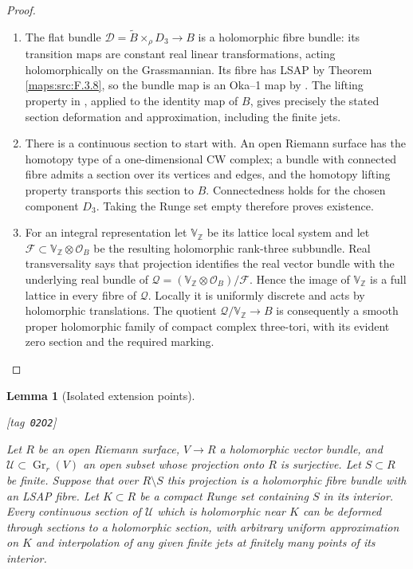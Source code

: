 \documentclass[11pt,a4paper]{article}
\numberwithin{equation}{section}
\newtheorem{lemma}[lemma]{Lemma}
\theoremstyle{definition}
\newcommand{\StatementRecord}[4]{{\upshape\footnotesize[tag~\texttt{#3}]}\enspace\ignorespaces}
\begin{document}
\begin{proof}
\begin{enumerate}[label=\arabic*.]
\item The flat bundle
$\mathscr D=\widetilde B\times_\rho D_3\to B$ is a holomorphic
fibre bundle: its transition maps are constant real linear
transformations, acting holomorphically on the Grassmannian.
Its fibre has LSAP by Theorem \ref{maps:src:F.3.8}, so the bundle map is an
Oka--1 map by \cite[arXiv v5, Proposition~7.13(d), p.~24]{IVVOkaOneV5}.
The lifting property in \cite[arXiv v5, Definition~7.7, p.~22]{IVVOkaOneV5}, applied
to the identity map of $B$, gives precisely the stated section
deformation and approximation, including the finite jets.


\item There is a continuous section to start with.  An open Riemann
surface has the homotopy type of a one-dimensional CW complex;
a bundle with connected fibre admits a section over its vertices
and edges, and the homotopy lifting property transports this
section to $B$.  Connectedness holds for the chosen component
$D_3$.  Taking the Runge set empty therefore proves existence.

\item For an integral representation let $\mathbb V_\mathbb Z$ be its
lattice local system and let $\mathcal F\subset
\mathbb V_\mathbb Z\otimes\mathcal O_B$ be the resulting
holomorphic rank-three subbundle.  Real transversality says that
projection identifies the real vector bundle with the underlying
real bundle of
$\mathcal Q=(\mathbb V_\mathbb Z\otimes\mathcal O_B)/\mathcal F$.
Hence the image of $\mathbb V_\mathbb Z$ is a full lattice in
every fibre of $\mathcal Q$.  Locally it is uniformly discrete
and acts by holomorphic translations.  The quotient
$\mathcal Q/\mathbb V_\mathbb Z\to B$ is consequently a smooth
proper holomorphic family of compact complex three-tori,
with its evident zero section and the required marking.

\end{enumerate}
\end{proof}




\begin{lemma}[Isolated extension points]\hypertarget{tag-02O2}{}\label{maps:src:F.3.10}
\StatementRecord{maps:src:F.3.10}{proved}{02O2}{\eqref{maps:eq:F.O5}; \cite[Theorem 1.2, preprint p.~3]{ffForstnericPrezelj02}; \cite[Theorem 2.13, p.~9]{IVVOkaOneV5}}


Let $R$ be an open Riemann surface, $V\to R$ a holomorphic vector
bundle, and $\mathscr U\subset\operatorname{Gr}_r(V)$ an open
subset whose projection onto $R$ is surjective.  Let $S\subset R$
be finite.  Suppose that over $R\setminus S$ this projection is
a holomorphic fibre bundle with an LSAP fibre.  Let $K\subset R$
be a compact Runge set containing $S$ in its interior.
Every continuous section of $\mathscr U$ which is holomorphic
near $K$ can be deformed through sections to a holomorphic
section, with arbitrary uniform approximation on $K$ and
interpolation of any given finite jets at finitely many points
of its interior.

\end{lemma}
\end{document}
